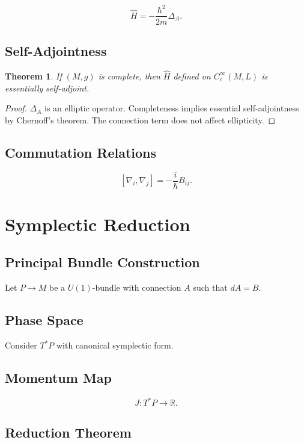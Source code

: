 \documentclass[11pt]{article}
\newtheorem{theorem}{Theorem}
\begin{document}
\[
\hat{H} = -\frac{\hbar^2}{2m}\Delta_A.
\]

\subsection{Self-Adjointness}

\begin{theorem}
If $(M,g)$ is complete, then $\hat{H}$ defined on $C_c^\infty(M,L)$ is essentially self-adjoint.
\end{theorem}

\begin{proof}
$\Delta_A$ is an elliptic operator. Completeness implies essential self-adjointness by Chernoff's theorem. The connection term does not affect ellipticity.
\end{proof}

\subsection{Commutation Relations}

\[
[\nabla_i,\nabla_j] = -\frac{i}{\hbar}B_{ij}.
\]

\section{Symplectic Reduction}

\subsection{Principal Bundle Construction}

Let $P\to M$ be a $U(1)$-bundle with connection $A$ such that $dA=B$.

\subsection{Phase Space}

Consider $T^*P$ with canonical symplectic form.

\subsection{Momentum Map}

\[
J:T^*P\to \mathbb{R}.
\]

\subsection{Reduction Theorem}
\end{document}
